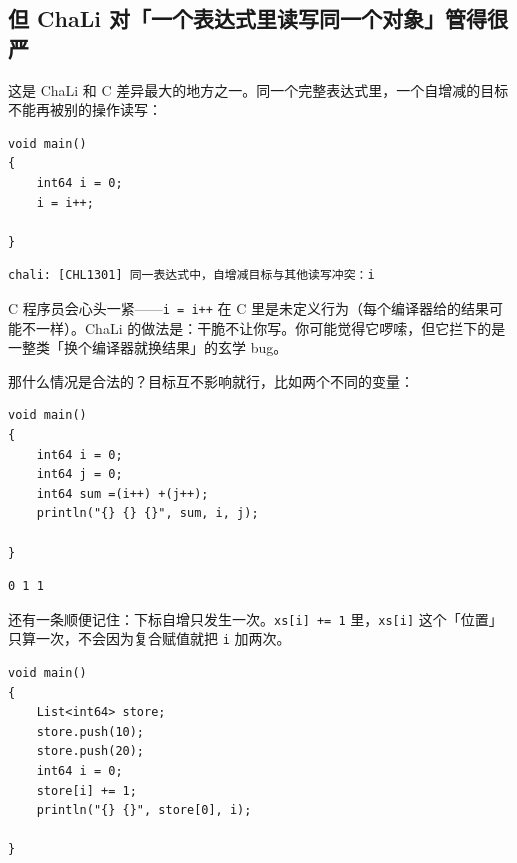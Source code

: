 \subsection*{但 ChaLi 对「一个表达式里读写同一个对象」管得很严}

这是 ChaLi 和 C 差异最大的地方之一。同一个完整表达式里，一个自增减的目标不能再被别的操作读写：

\par
\medskip
\begin{lstlisting}[style=chali]
void main()
{
    int64 i = 0;
    i = i++;

}
\end{lstlisting}
\par
\medskip

\par
\medskip
\begin{lstlisting}[style=out]
chali: [CHL1301] 同一表达式中，自增减目标与其他读写冲突：i
\end{lstlisting}
\par
\medskip

C 程序员会心头一紧——\texttt{i =\allowbreak{} i++} 在 C 里是未定义行为（每个编译器给的结果可能不一样）。ChaLi 的做法是：干脆不让你写。你可能觉得它啰嗦，但它拦下的是一整类「换个编译器就换结果」的玄学 bug。

那什么情况是合法的？目标互不影响就行，比如两个不同的变量：

\par
\medskip
\begin{lstlisting}[style=chali]
void main()
{
    int64 i = 0;
    int64 j = 0;
    int64 sum =(i++) +(j++);
    println("{} {} {}", sum, i, j);

}
\end{lstlisting}
\par
\medskip

\par
\medskip
\begin{lstlisting}[style=out]
0 1 1
\end{lstlisting}
\par
\medskip

还有一条顺便记住：下标自增只发生一次。\texttt{xs[\allowbreak{}i]\allowbreak{} +=\allowbreak{} 1} 里，\texttt{xs[\allowbreak{}i]\allowbreak{}} 这个「位置」只算一次，不会因为复合赋值就把 \texttt{i} 加两次。

\par
\medskip
\begin{lstlisting}[style=chali]
void main()
{
    List<int64> store;
    store.push(10);
    store.push(20);
    int64 i = 0;
    store[i] += 1;
    println("{} {}", store[0], i);

}
\end{lstlisting}
\par
\medskip

